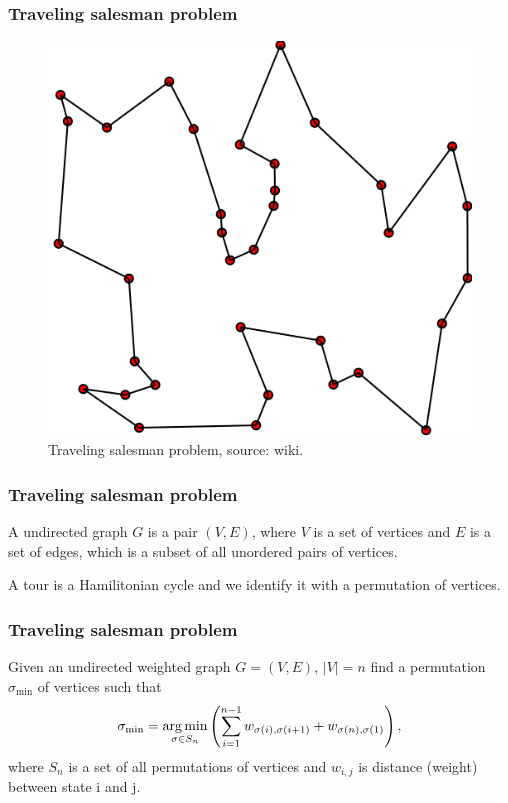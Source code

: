 \begin{frame}
	\frametitle{Traveling salesman problem}
	\begin{figure}
		\centering
		\includegraphics[scale=0.17]{img/travelling_salesman_problem}
		\caption{Traveling salesman problem, source: wiki.}
	\end{figure}
\end{frame}

\begin{frame}
	\frametitle{Traveling salesman problem}
	\begin{definition}
		A undirected graph $G$ is a pair $(V, E)$, where $V$ is a set of vertices and $E$ is a set of edges, which is a subset of all unordered pairs of vertices.
	\end{definition}
	\begin{definition}
		A tour is a Hamilitonian cycle and we identify it with a permutation of vertices.
	\end{definition}
\end{frame}

\begin{frame}
	\frametitle{Traveling salesman problem}
	\begin{definition}
		Given an undirected weighted graph $G = (V, E)$, $|V| = n$ find a permutation $\sigma_{\min}$ of vertices such that
		\begin{equation*}
		\sigma_{\min} = \underset{\sigma \in S_n}{\operatorname*{arg\,min}} \left( \sum_{i=1}^{n-1} w_{\sigma(i), \sigma(i+1)} + w_{\sigma(n), \sigma(1)} \right),
		\end{equation*}
		where $S_n$ is a set of all permutations of vertices and $w_{i,j}$ is distance (weight) between state i and j.
	\end{definition}
\end{frame}
